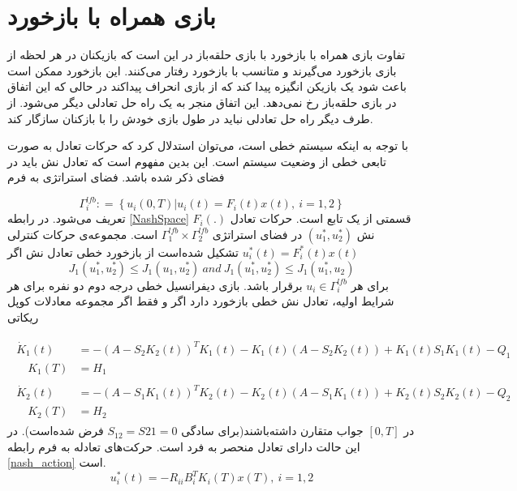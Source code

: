 \section{بازی همراه با بازخورد}
تفاوت بازی همراه با بازخورد  با بازی حلقه‌باز در این است که بازیکنان در هر لحظه از بازی بازخورد می‌گیرند و متانسب با بازخورد رفتار می‌کنند. این بازخورد ممکن است باعث شود یک بازیکن انگیزه پیدا کند که از بازی انحراف پیداکند در حالی که این اتفاق در بازی حلقه‌باز رخ نمی‌دهد. این اتفاق منجر به یک راه حل تعادلی دیگر می‌شود. از طرف دیگر راه حل تعادلی نباید در طول بازی خودش را با بازکنان سازگار کند.


با توجه به اینکه سیستم خطی است، می‌توان استدلال کرد که حرکات تعادل به صورت تابعی خطی از وضعیت سیستم است. این بدین مفهوم است که تعادل نش باید در فضای ذکر شده باشد. فضای استراتژی به فرم 

\begin{equation}\label{NashSpace}
	\Gamma^{lfb}_i :‌= \left\{u_i(0, T)\vert u_i(t) = F_i(t)x(t) ,~ i = 1, 2\right\}
\end{equation}
تعریف می‌شود. در رابطه
 \ref{NashSpace}
$F_i(.)$
قسمتی از یک تابع است. حرکات تعادل نش
$(u_1^*, u_2^*)$
در فضای استراتژی 
$\Gamma^{lfb}_1\times\Gamma^{lfb}_2$
است.
مجموعه‌ی حرکات کنترلی 
$u_i^*(t)=F_i^*(t)x(t)$
تشکیل شده‌است از بازخورد خطی تعادل نش اگر
\begin{equation*}
	J_1(u_1^*, u_2^*)\leq J_1(u_1, u_2^*)~ and~
	J_1(u_1^*, u_2^*)\leq J_1(u_1^*, u_2)
\end{equation*}
برای هر 
$u_i\in \Gamma^{lfb}_i$
برقرار باشد.
بازی دیفرانسیل خطی درجه دوم دو نفره برای هر شرایط اولیه، تعادل نش خطی بازخورد دارد اگر و فقط اگر مجموعه معادلات کوپل ریکاتی

\begin{align}
	\begin{split}
		\dot{K}_1(t) &= -(A-S_2K_2(t))^TK_1(t)-K_1(t)(A-S_2K_2(t))+
		K_1(t)S_1K_1(t)-Q_1\\
		\quad K_1(T) &= H_1
	\end{split}\\
	\begin{split}
		\dot{K}_2(t) &= -(A-S_1K_1(t))^TK_2(t)-K_2(t)(A-S_1K_1(t))+
		K_2(t)S_2K_2(t)-Q_2\\
		\quad K_2(T) &= H_2 
	\end{split}
\end{align}
در 
$[0, T]$
جواب متقارن داشته‌باشند(برای سادگی 
$S_{12}=S{21} =0 $
فرض شده‌است).
در این حالت دارای تعادل منحصر به فرد است. حرکت‌های تعادله به فرم رابطه
\ref{nash_action}
است.
\begin{equation}\label{nash_action}
	u_i^*(t) = -R_{ii}B_i^TK_i(T)x(T),~i = 1, 2
\end{equation}
